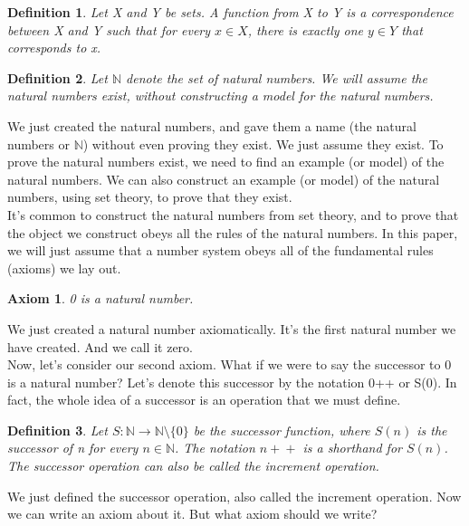 \documentclass{article}
\newtheorem{axiom}{Axiom}
\newtheorem{definition}{Definition}
\newcommand{\inc}[1]{\mathrel{{{#1}+}+}}
\begin{document}
\begin{definition}
Let X and Y be sets. A function from X to Y is a correspondence between X and Y such that for every $x \in X$, there is exactly one $y \in Y$ that corresponds to x. 
\end{definition}

\begin{definition}
Let $\mathbb{N}$ denote the set of natural numbers. We will assume the natural numbers exist, without constructing a model for the natural numbers.
\end{definition}

We just created the natural numbers, and gave them a name (the natural numbers or $\mathbb{N}$) without even proving they exist. We just assume they exist. To prove the natural numbers exist, we need to find an example (or model) of the natural numbers. We can also construct an example (or model) of the natural numbers, using set theory, to prove that they exist. \\

It's common to construct the natural numbers from set theory, and to prove that the object we construct obeys all the rules of the natural numbers. In this paper, we will just assume that a number system obeys all of the fundamental rules (axioms) we lay out.

\begin{axiom}
0 is a natural number.
\end{axiom}

We just created a natural number axiomatically. It's the first natural number we have created. And we call it zero. \\

Now, let's consider our second axiom. What if we were to say the successor to 0 is a natural number? Let's denote this successor by the notation 0++ or S(0). In fact, the whole idea of a successor is an operation that we must define.

\begin{definition}
Let $S : \mathbb{N} \to \mathbb{N}\setminus\{0\}$ be the successor function, where $S(n)$ is the successor of n for every $n \in \mathbb{N}$. The notation $\inc{n}$ is a shorthand for $S(n)$. The successor operation can also be called the increment operation.
\end{definition}

We just defined the successor operation, also called the increment operation. Now we can write an axiom about it. But what axiom should we write? \\
\end{document}
